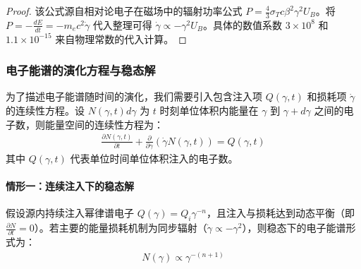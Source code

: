 \begin{proof}
该公式源自相对论电子在磁场中的辐射功率公式 $P = \frac{4}{3}\sigma_T c \beta^2 \gamma^2 U_B$。将 $P = -\frac{dE}{dt} = -m_e c^2 \dot{\gamma}$ 代入整理可得 $\dot{\gamma} \propto -\gamma^2 U_B$。具体的数值系数 $3 \times 10^8$ 和 $1.1 \times 10^{-15}$ 来自物理常数的代入计算。
\end{proof}


\subsubsection{电子能谱的演化方程与稳态解}

为了描述电子能谱随时间的演化，我们需要引入包含注入项 $Q(\gamma, t)$ 和损耗项 $\dot{\gamma}$ 的连续性方程。设 $N(\gamma, t)d\gamma$ 为 $t$ 时刻单位体积内能量在 $\gamma$ 到 $\gamma+d\gamma$ 之间的电子数，则能量空间的连续性方程为：
\begin{align}
\frac{\partial N(\gamma, t)}{\partial t} + \frac{\partial}{\partial \gamma} \left( \dot{\gamma} N(\gamma, t) \right) = Q(\gamma, t) \label{eq:continuity}
\end{align}
其中 $Q(\gamma, t)$ 代表单位时间单位体积注入的电子数。

\paragraph{情形一：连续注入下的稳态解}

\begin{theorem}[稳态电子能谱]
假设源内持续注入幂律谱电子 $Q(\gamma) = Q_i \gamma^{-n}$，且注入与损耗达到动态平衡（即 $\frac{\partial N}{\partial t} = 0$）。若主要的能量损耗机制为同步辐射（$\dot{\gamma} \propto -\gamma^2$），则稳态下的电子能谱形式为：
\begin{align}
N(\gamma) \propto \gamma^{-(n+1)}
\end{align}
\end{theorem}

